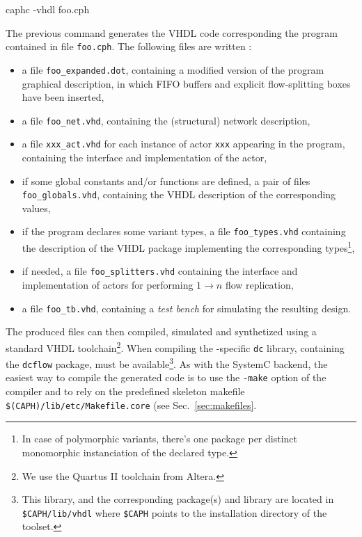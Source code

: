 \begin{example}
caphc -vhdl foo.cph  
\end{example}

The previous command generates the VHDL code corresponding the program contained in file
\texttt{foo.cph}. The following files are written :
\begin{itemize}
\item a file \verb|foo_expanded.dot|, containing a modified version of the program graphical
  description,  in which FIFO buffers and explicit flow-splitting boxes have been inserted,
\item a file \verb|foo_net.vhd|, containing the (structural) network description,
\item a file \verb|xxx_act.vhd| for each instance of actor \verb|xxx| appearing in
  the program, containing the interface and implementation of the actor,
\item if some global constants and/or functions are defined, a pair of files
  \verb|foo_globals.vhd|, containing the VHDL description of the corresponding values,
\item if the program declares some variant types, a file \verb|foo_types.vhd| containing the description
  of the VHDL package implementing the corresponding types\footnote{In case of polymorphic variants,
    there's one package per distinct monomorphic instanciation of the  declared type.},
\item if needed, a file \verb|foo_splitters.vhd| containing the interface and implementation of
  actors for performing $1 \rightarrow n$ flow replication,
\item a file \verb|foo_tb.vhd|, containing a \emph{test bench} for simulating the resulting
  design.
\end{itemize}

The produced files can then compiled, simulated and synthetized using a standard VHDL
toolchain\footnote{We use the Quartus II toolchain from Altera.}. When compiling
the \caph-specific \texttt{dc} library, containing the \texttt{dcflow} package, must be
available\footnote{This library, and the corresponding package(s) 
  and library are located in \texttt{\${CAPH}/lib/vhdl} where \texttt{\${CAPH}} points to the
  installation directory of the \caph toolset.}. 
 As with the SystemC backend, the easiest way to compile the generated code is to
use the \verb|-make| option of the compiler and to rely on the predefined skeleton makefile
\verb|$(CAPH)/lib/etc/Makefile.core| (see Sec.~\ref{sec:makefiles}.

